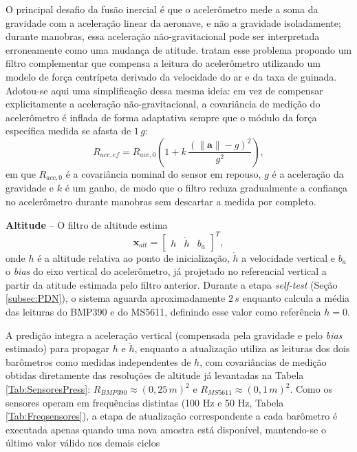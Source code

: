 O principal desafio da fusão inercial é que o acelerômetro mede a soma da gravidade com a aceleração linear da aeronave, e não a gravidade isoladamente; durante manobras, essa aceleração não-gravitacional pode ser interpretada erroneamente como uma mudança de atitude. \cite{euston2008fixedwing} tratam esse problema propondo um filtro complementar que compensa a leitura do acelerômetro utilizando um modelo de força centrípeta derivado da velocidade do ar e da taxa de guinada. Adotou-se aqui uma simplificação dessa mesma ideia: em vez de compensar explicitamente a aceleração não-gravitacional, a covariância de medição do acelerômetro é inflada de forma adaptativa sempre que o módulo da força específica medida se afasta de $1\,g$:
\begin{equation}
    R_{acc,ef} = R_{acc,0}\left(1 + k\,\frac{\left(\lVert \mathbf{a} \rVert - g\right)^2}{g^2}\right),
\end{equation}
em que $R_{acc,0}$ é a covariância nominal do sensor em repouso, $g$ é a aceleração da gravidade e $k$ é um ganho, de modo que o filtro reduza gradualmente a confiança no acelerômetro durante manobras sem descartar a medida por completo.

\textbf{Altitude} -- O filtro de altitude estima
\begin{equation}
    \mathbf{x}_{alt} = \begin{bmatrix} h & \dot{h} & b_a \end{bmatrix}^T,
\end{equation}
onde $h$ é a altitude relativa ao ponto de inicialização, $\dot{h}$ a velocidade vertical e $b_a$ o \textit{bias} do eixo vertical do acelerômetro, já projetado no referencial vertical a partir da atitude estimada pelo filtro anterior. Durante a etapa \textit{self-test} (Seção \ref{subsec:PDN}), o sistema aguarda aproximadamente $2\,s$ enquanto calcula a média das leituras do BMP390 e do MS5611, definindo esse valor como referência $h=0$.

A predição integra a aceleração vertical (compensada pela gravidade e pelo \textit{bias} estimado) para propagar $h$ e $\dot h$, enquanto a atualização utiliza as leituras dos dois barômetros como medidas independentes de $h$, com covariâncias de medição obtidas diretamente das resoluções de altitude já levantadas na Tabela \ref{Tab:SensoresPress}: $R_{BMP390} \approx (0{,}25\,m)^2$ e $R_{MS5611} \approx (0{,}1\,m)^2$. Como os sensores operam em frequências distintas (100 Hz e 50 Hz, Tabela \ref{Tab:Freqsensores}), a etapa de atualização correspondente a cada barômetro é executada apenas quando uma nova amostra está disponível, mantendo-se o último valor válido nos demais ciclos

